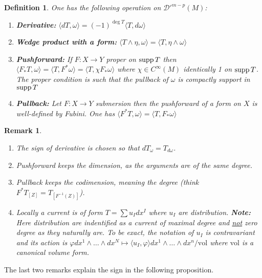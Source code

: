 \documentclass[11pt]{article}
\newtheorem{remark}{Remark}
\newtheorem{definition}{Definition}
\newcommand{\supp}{\mathop{\rm supp}\nolimits}
\begin{document}
\begin{definition}
One has the following operation on \(\mathcal{D}'^{m-p}(M)\):
\begin{enumerate}
\item \textbf{Derivative:} \(\langle dT, \omega \rangle  = (-1)^{\deg{T}} \langle T, d\omega \rangle\)
\item \textbf{Wedge product with a form:} \(\langle T\wedge \eta,\omega \rangle  = \langle T, \eta \wedge
   \omega \rangle\)
\item \textbf{Pushforward:} If \(F: X \longrightarrow Y\) proper on \(\supp T\) then \(\langle
   F_*T, \omega \rangle = \langle T, F^*\omega \rangle = \langle T, \chi F_* \omega
   \rangle\) where \(\chi \in C^{\infty}(M)\) identically 1 on \(\supp T\). The
proper condition is such that the pullback of \(\omega\) is compactly support in \(\supp T\)
\item \textbf{Pullback:} Let \(F: X \longrightarrow Y\) submersion then the pushforward of a form
on \(X\) is well-defined by Fubini. One has \(\langle F^* T, \omega \rangle =
   \langle T, F_* \omega \rangle\)
\end{enumerate}
\end{definition}

\begin{remark}
\begin{enumerate}
\item The sign of derivative is chosen so that \(dT_\omega = T_{d\omega}\).
\item Pushforward keeps the dimension, as the arguments are of the same degree.
\item Pullback keeps the codimension, meaning the degree (think \(F^* T_{[Z]} =
   T_{[F^{-1}(Z)]}\)).
\item Locally a current is of form \(T = \sum u_I dx^I\) where \(u_I\) are
distribution. \textbf{Note:} Here distribution are indentified as a current of maximal degree
and \uline{not} zero degree as they naturally are. To be exact, the notation of \(u_I\) is
contravariant and its action is \(\varphi dx^1\wedge\dots\wedge dx^N \mapsto \langle
   u_I, \varphi \rangle dx^1\wedge\dots\wedge dx^n/\text{vol}\) where \(\text{vol}\) is
a canonical volume form.
\end{enumerate}
\end{remark}

The last two remarks explain the sign in the following proposition.
\end{document}
